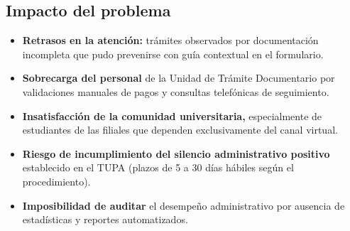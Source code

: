 \subsection{Impacto del problema}
 
\begin{itemize}
    \item \textbf{Retrasos en la atención:} trámites observados por documentación incompleta que pudo prevenirse con guía contextual en el formulario.
    \item \textbf{Sobrecarga del personal} de la Unidad de Trámite Documentario por validaciones manuales de pagos y consultas telefónicas de seguimiento.
    \item \textbf{Insatisfacción de la comunidad universitaria,} especialmente de estudiantes de las filiales que dependen exclusivamente del canal virtual.
    \item \textbf{Riesgo de incumplimiento del silencio administrativo positivo} establecido en el TUPA (plazos de 5 a 30 días hábiles según el procedimiento).
    \item \textbf{Imposibilidad de auditar} el desempeño administrativo por ausencia de estadísticas y reportes automatizados.
\end{itemize}